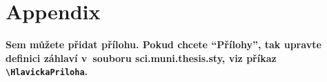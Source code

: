 \chapter*{Appendix}


{\bf Sem můžete přidat přílohu. Pokud chcete ``Přílohy'', tak upravte definici záhlaví v~souboru sci.muni.thesis.sty, viz příkaz
\verb+\HlavickaPriloha+.}
\medskip


\lipsum[50-65]

